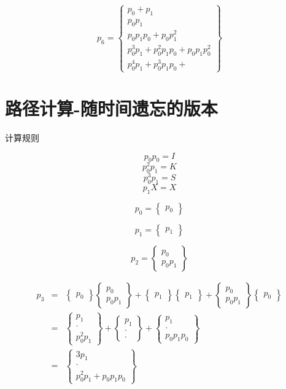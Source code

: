 \documentclass[a4paper,12pt]{article}
\numberwithin{definition}{section}
\numberwithin{lemma}{section}
\numberwithin{proposition}{section}
\numberwithin{theorem}{section}
\numberwithin{grammar}{section}
\numberwithin{program}{section}
\numberwithin{convention}{section}
\numberwithin{corollary}{section}
\numberwithin{principle}{section}
\begin{document}
$$
p_6 = \begin{Bmatrix}
    p_0 + p_1 \\
    p_0 p_1 \\
    p_0 p_1 p_0 + p_0 p_1^2 \\
    p_0^3 p_1 + p_0^2 p_1 p_0 + p_0 p_1 p_0^2\\
    p_0^4 p_1 + p_0^3 p_1 p_0 +
\end{Bmatrix}
$$

\section{路径计算-随时间遗忘的版本}

计算规则

$$p_0 p_0 = I$$
$$p_0^2 p_1 = K$$
$$p_0^3 p_1 = S$$
$$p_1 X = X$$

$$p_0 = \begin{Bmatrix} p_0 \end{Bmatrix}$$

$$p_1 = \begin{Bmatrix} p_1 \end{Bmatrix}$$

$$p_2 = \begin{Bmatrix}  p_0 \\  p_0 p_1 \end{Bmatrix}$$

$$\begin{array}{lcl}
p_3 & = & \begin{Bmatrix} p_0 \end{Bmatrix} \begin{Bmatrix}  p_0 \\  p_0 p_1 \end{Bmatrix} +
          \begin{Bmatrix} p_1 \end{Bmatrix}\begin{Bmatrix} p_1 \end{Bmatrix} +
          \begin{Bmatrix} p_0 \\  p_0 p_1 \end{Bmatrix} \begin{Bmatrix} p_0 \end{Bmatrix}\\
    & = & \begin{Bmatrix} p_1 \\ \cdot \\ p_0^2 p_1 \end{Bmatrix} +
          \begin{Bmatrix} p_1 \\ \cdot \\ \cdot \end{Bmatrix} +
          \begin{Bmatrix} p_1 \\ \cdot \\ p_0 p_1 p_0 \end{Bmatrix} \\
    & = & \begin{Bmatrix} 3 p_1 \\ \cdot \\ p_0^2 p_1 + p_0 p_1 p_0 \end{Bmatrix}
\end{array}
$$
\end{document}
